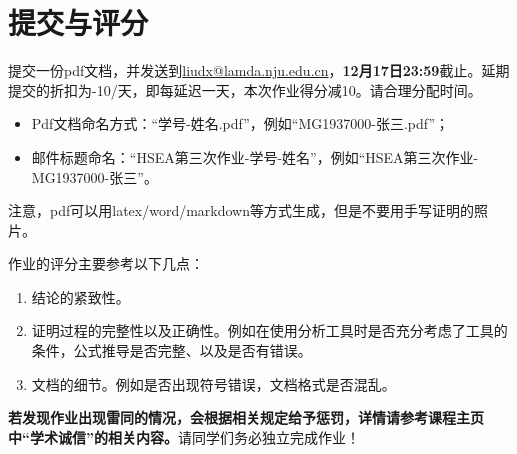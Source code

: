 \documentclass[a4paper]{article}
\begin{document}
\section{提交与评分}
提交一份pdf文档，并发送到\href{mailto:liudx@lamda.nju.edu.cn}{liudx@lamda.nju.edu.cn}，\textbf{12月17日23:59}截止。延期提交的折扣为-10/天，即每延迟一天，本次作业得分减10。请合理分配时间。
\begin{itemize}
	\item Pdf文档命名方式：“学号-姓名.pdf”，例如“MG1937000-张三.pdf”；
	\item 邮件标题命名：“HSEA第三次作业-学号-姓名”，例如“HSEA第三次作业-MG1937000-张三”。
\end{itemize}
注意，pdf可以用latex/word/markdown等方式生成，但是不要用手写证明的照片。


作业的评分主要参考以下几点：
\begin{enumerate}
	\item 结论的紧致性。
	\item 证明过程的完整性以及正确性。例如在使用分析工具时是否充分考虑了工具的条件，公式推导是否完整、以及是否有错误。
	\item 文档的细节。例如是否出现符号错误，文档格式是否混乱。
\end{enumerate}

\textbf{若发现作业出现雷同的情况，会根据相关规定给予惩罚，详情请参考课程主页中“学术诚信”的相关内容。}请同学们务必独立完成作业！
\end{document}
